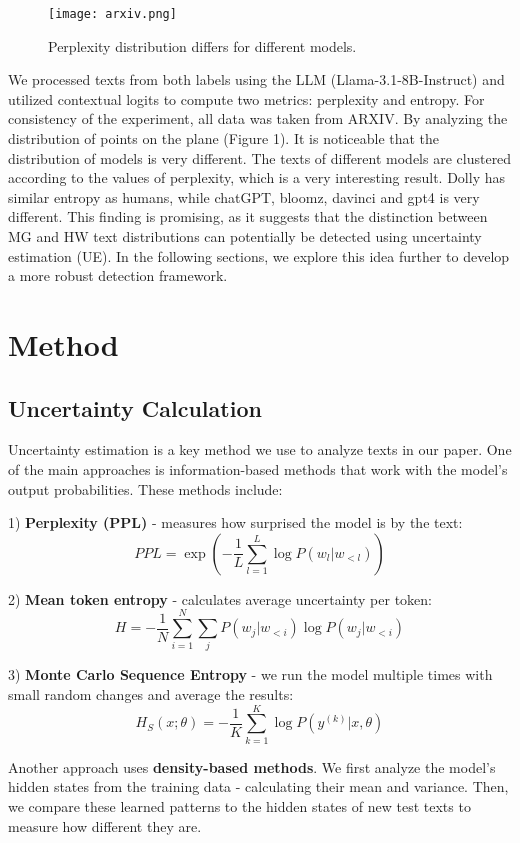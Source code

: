 \documentclass[a4paper, 12pt]{article}
\begin{document}
\begin{figure}[bhtp]
	\texttt{[image: arxiv.png]}
	\caption{Perplexity distribution differs for different models.}
	\label{fig:schema}
\end{figure}

We processed texts from both labels using the LLM (Llama-3.1-8B-Instruct) and utilized contextual logits to compute two metrics: perplexity and entropy. For consistency of the experiment, all data was taken from ARXIV. By analyzing the distribution of points on the plane (Figure 1). It is noticeable that the distribution of models is very different. The texts of different models are clustered according to the values of perplexity, which is a very interesting result. Dolly has similar entropy as humans, while chatGPT, bloomz, davinci and gpt4 is very different. This finding is promising, as it suggests that the distinction between MG and HW text distributions can potentially be detected using uncertainty estimation (UE). In the following sections, we explore this idea further to develop a more robust detection framework. 

\section{Method}
\subsection{Uncertainty Calculation}
Uncertainty estimation is a key method we use to analyze texts in our paper. One of the main approaches is information-based methods that work with the model's output probabilities. These methods include:

1) \textbf{Perplexity (PPL)} - measures how surprised the model is by the text:
$$PPL = \exp\left(-\frac{1}{L} \sum_{l=1}^{L} \log P(w_l | w_{<l})\right)$$

2) \textbf{Mean token entropy} - calculates average uncertainty per token:
$$H = -\frac{1}{N} \sum_{i=1}^{N} \sum_{j} P(w_j | w_{<i}) \log P(w_j | w_{<i})$$

3) \textbf{Monte Carlo Sequence Entropy} - we run the model multiple times with small random changes and average the results:
$$H_S(x; \theta) = - \frac{1}{K} \sum_{k=1}^{K} \log P(y^{(k)} | x, \theta)$$

Another approach uses \textbf{density-based methods}. We first analyze the model's hidden states from the training data - calculating their mean and variance. Then, we compare these learned patterns to the hidden states of new test texts to measure how different they are.
\end{document}
